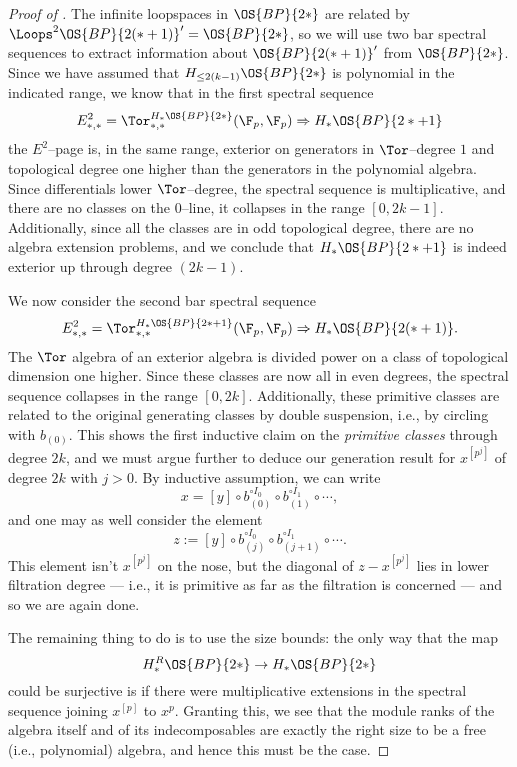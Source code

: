 \begin{proof}[{Proof of }]
The infinite loopspaces in $\OS{BP}{2*}$ are related by $\Loops^2 \OS{BP}{2(*+1)}' = \OS{BP}{2*}$, so we will use two bar spectral sequences to extract information about $\OS{BP}{2(*+1)}'$ from $\OS{BP}{2*}$.  Since we have assumed that $H_{\le 2(k-1)} \OS{BP}{2*}$ is polynomial in the indicated range, we know that in the first spectral sequence \[E^2_{*, *} = \Tor^{H_* \OS{BP}{2*}}_{*, *}(\F_p, \F_p) \Rightarrow H_* \OS{BP}{2*+1}\] the $E^2$--page is, in the same range, exterior on generators in $\Tor$--degree $1$ and topological degree one higher than the generators in the polynomial algebra.  Since differentials lower $\Tor$--degree, the spectral sequence is multiplicative, and there are no classes on the $0$--line, it collapses in the range $[0, 2k-1]$.  Additionally, since all the classes are in odd topological degree, there are no algebra extension problems, and we conclude that $H_* \OS{BP}{2*+1}$ is indeed exterior up through degree $(2k-1)$.

We now consider the second bar spectral sequence \[E^2_{*, *} = \Tor^{H_* \OS{BP}{2*+1}}_{*, *}(\F_p, \F_p) \Rightarrow H_* \OS{BP}{2(*+1)}.\]  The $\Tor$ algebra of an exterior algebra is divided power on a class of topological dimension one higher.  Since these classes are now all in even degrees, the spectral sequence collapses in the range $[0, 2k]$.  Additionally, these primitive classes are related to the original generating classes by double suspension, i.e., by circling with $b_{(0)}$.  This shows the first inductive claim on the \emph{primitive classes} through degree $2k$, and we must argue further to deduce our generation result for $x^{[p^j]}$ of degree $2k$ with $j > 0$.  By inductive assumption, we can write \[x = [y] \circ b_{(0)}^{\circ I_0} \circ b_{(1)}^{\circ I_1} \circ \cdots,\] and one may as well consider the element \[z := [y] \circ b_{(j)}^{\circ I_0} \circ b_{(j+1)}^{\circ I_1} \circ \cdots.\]  This element isn't $x^{[p^j]}$ on the nose, but the diagonal of $z - x^{[p^j]}$ lies in lower filtration degree --- i.e., it is primitive as far as the filtration is concerned --- and so we are again done.

The remaining thing to do is to use the size bounds: the only way that the map \[H_*^R \OS{BP}{2*} \to H_* \OS{BP}{2*}\] could be surjective is if there were multiplicative extensions in the spectral sequence joining $x^{[p]}$ to $x^p$.  Granting this, we see that the module ranks of the algebra itself and of its indecomposables are exactly the right size to be a free (i.e., polynomial) algebra, and hence this must be the case.
\end{proof}

